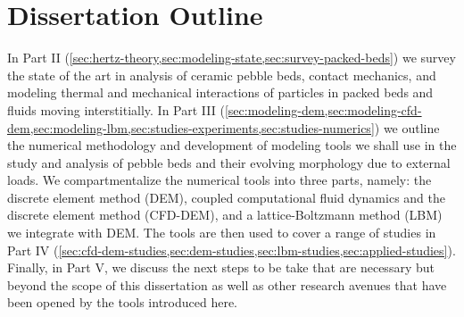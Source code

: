 \chapter{Dissertation Outline}
In Part II (\cref{sec:hertz-theory,sec:modeling-state,sec:survey-packed-beds}) we survey the state of the art in analysis of ceramic pebble beds, contact mechanics, and modeling thermal and mechanical interactions of particles in packed beds and fluids moving interstitially.  In Part III (\cref{sec:modeling-dem,sec:modeling-cfd-dem,sec:modeling-lbm,sec:studies-experiments,sec:studies-numerics}) we outline the numerical methodology and development of modeling tools we shall use in the study and analysis of pebble beds and their evolving morphology due to external loads. We compartmentalize the numerical tools into three parts, namely: the discrete element method (DEM), coupled computational fluid dynamics and the discrete element method (CFD-DEM), and a lattice-Boltzmann method (LBM) we integrate with DEM. The tools are then used to cover a range of studies in Part IV (\cref{sec:cfd-dem-studies,sec:dem-studies,sec:lbm-studies,sec:applied-studies}). Finally, in Part V, we discuss the next steps to be take that are necessary but beyond the scope of this dissertation as well as other research avenues that have been opened by the tools introduced here.